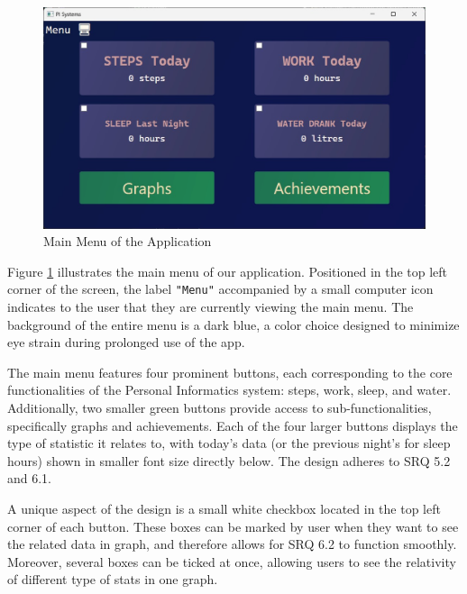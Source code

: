 \documentclass[12pt]{article}
\begin{document}
\begin{figure}[!ht]
  \centering
  \includegraphics[width = 0.5\linewidth]{Main Menu}
  \caption{Main Menu of the Application}
  \label{fig:Menu}
\end{figure}

Figure \ref{fig:Menu} illustrates the main menu of our application. Positioned in the top left
corner of the screen, the label \texttt{"Menu"} accompanied by a small computer icon indicates
to the user that they are currently viewing the main menu. The background of the 
entire menu is a dark blue, a color choice designed to minimize eye strain during 
prolonged use of the app.\par

The main menu features four prominent buttons, each corresponding to the core 
functionalities of the Personal Informatics system: steps, work, sleep, and water.
Additionally, two smaller green buttons provide access to sub-functionalities, 
specifically graphs and achievements. Each of the four larger buttons displays 
the type of statistic it relates to, with today's data (or the previous night's
for sleep hours) shown in smaller font size directly below. The design adheres to SRQ 5.2 and 6.1.\par

A unique aspect of the design is a small white checkbox located in the top left
corner of each button. These boxes can be marked by user when they want to see
the related data in graph, and therefore allows for SRQ 6.2 to function smoothly.
Moreover, several boxes can be ticked at once, allowing users to see the relativity of different type of stats in one graph.\par
\end{document}
